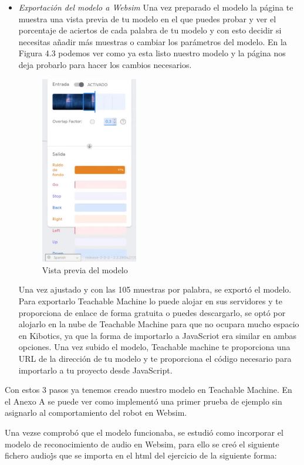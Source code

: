\begin{itemize}
\item  \textit{Exportación del modelo a Websim}
Una vez preparado el modelo la página te muestra una vista previa de tu modelo en el que puedes probar y ver el porcentaje de aciertos de cada palabra de tu modelo y con esto decidir si necesitas añadir más muestras o cambiar los parámetros del modelo.  En la Figura 4.3 podemos ver como ya esta listo nuestro modelo y la página nos deja probarlo para hacer los cambios necesarios.

\begin{figure}[H]
 \centering
    \includegraphics[width=0.4\textwidth, height=0.6\textwidth]{chapters/images/teachablemachine2.png}
    \caption{Vista previa del modelo}
\end{figure}
 

Una vez ajustado y con las 105 muestras por palabra, se exportó el modelo. 
Para exportarlo Teachable Machine lo puede alojar en sus servidores y te proporciona de enlace de forma gratuita o puedes descargarlo, se optó por alojarlo en la nube de Teachable Machine para que no ocupara mucho espacio en Kibotics, ya que la forma de importarlo  a JavaScriot era similar en ambas opciones.
Una vez subido el modelo, Teachable machine te proporciona una URL de la dirección de tu modelo y  te proporciona el código necesario para importarlo a tu proyecto desde JavaScript.
\end{itemize}

Con estos 3 pasos ya tenemos creado nuestro modelo en  Teachable Machine. En el Anexo A se puede ver como implementó una primer prueba de ejemplo sin asignarlo al comportamiento del robot en Websim.

Una vezse comprobó que el modelo funcionaba, se estudió como incorporar el modelo de reconocimiento de audio en Websim, para ello  se creó el siguiente fichero audio\.js que se importa en el html del ejercicio de la siguiente forma:   

